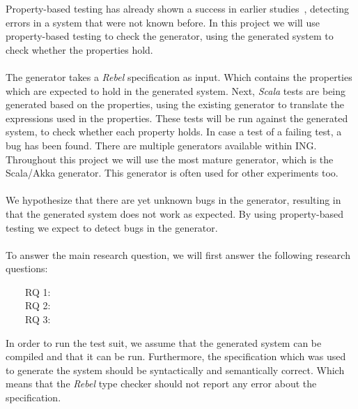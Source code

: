 Property-based testing has already shown a success in earlier studies~\cite{fink1997property,claessen2011quickcheck,arts2006testing}, detecting errors in a system that were not known before. In this project we will use property-based testing to check the generator, using the generated system to check whether the properties hold.\\
\\
The generator takes a \textit{Rebel} specification as input. Which contains the properties which are expected to hold in the generated system. Next, \textit{Scala} tests are being generated based on the properties, using the existing generator to translate the expressions used in the properties. These tests will be run against the generated system, to check whether each property holds. In case a test of a failing test, a bug has been found. There are multiple generators available within ING. Throughout this project we will use the most mature generator, which is the Scala/Akka generator. This generator is often used for other experiments too.\\
\\
We hypothesize that there are yet unknown bugs in the generator, resulting in that the generated system does not work as expected. By using property-based testing we expect to detect bugs in the generator.\\
\\
To answer the main research question, we will first answer the following research questions:
\begin{description}
\item[~~~~RQ 1:] \rqOne
\item[~~~~RQ 2:] \rqTwo
\item[~~~~RQ 3:] \rqThree
\end{description}
In order to run the test suit, we assume that the generated system can be compiled and that it can be run. Furthermore, the specification which was used to generate the system should be syntactically and semantically correct. Which means that the \textit{Rebel} type checker should not report any error about the specification.\\
